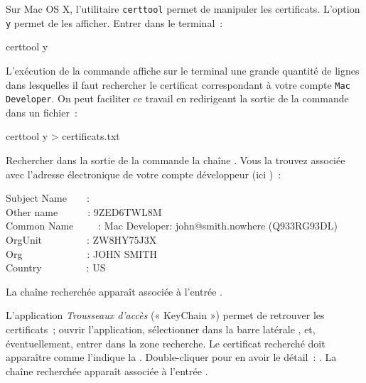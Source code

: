 
Sur Mac OS X, l'utilitaire \texttt{certtool} permet de manipuler les certificats. L'option \texttt{y} permet de les afficher. Entrer dans le terminal~:
\begin{SHELL}
certtool y
\end{SHELL}
L'exécution de la commande affiche sur le terminal une grande quantité de lignes dans lesquelles il faut rechercher le certificat correspondant à votre compte  \texttt{Mac Developer}. On peut faciliter ce travail en redirigeant la sortie de la commande dans un fichier~: 
\begin{SHELL}
certtool y > certificats.txt
\end{SHELL}

Rechercher dans la sortie de la commande la chaîne . Vous la trouvez associée avec l'adresse électronique de votre compte développeur (ici )~:
\begin{SHELL}
Subject Name~~~~:\\
Other name~~~~~~: 9ZED6TWL8M\\
Common Name~~~~~: Mac Developer: john@smith.nowhere (Q933RG93DL)\\
OrgUnit~~~~~~~~~: ZW8HY75J3X\\
Org~~~~~~~~~~~~~: JOHN SMITH\\
Country~~~~~~~~~: US
\end{SHELL}

La chaîne recherchée apparaît associée à l'entrée .




L'application \emph{Trousseaux d'accès} (« KeyChain ») permet de retrouver les certificats~; ouvrir l'application, sélectionner dans la barre latérale , et, éventuellement, entrer  dans la zone recherche. Le certificat recherché doit apparaître comme l'indique la . Double-cliquer pour en avoir le détail~: . La chaîne recherchée apparaît associée à l'entrée .


